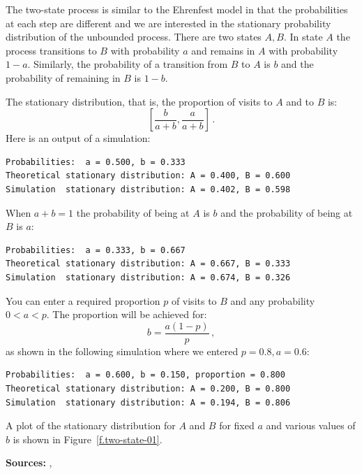 \documentclass[11pt,a4paper]{article}
\begin{document}
The two-state process is similar to the Ehrenfest model in that the probabilities at each step are different and we are interested in the stationary probability distribution of the unbounded process. There are two states $A,B$. In state $A$ the process transitions to $B$  with probability $a$ and remains in $A$ with probability $1-a$. Similarly, the probability of a transition from $B$ to $A$ is $b$ and the probability of remaining in $B$ is $1-b$.
\begin{center}
\end{center}
The stationary distribution, that is, the proportion of visits to $A$ and to $B$ is:
\[
\left[\frac{b}{a+b}, \frac{a}{a+b}\right]\,.
\]
Here is an output of a simulation:
\begin{verbatim}
Probabilities:  a = 0.500, b = 0.333
Theoretical stationary distribution: A = 0.400, B = 0.600
Simulation  stationary distribution: A = 0.402, B = 0.598
\end{verbatim}
When $a+b=1$ the probability of being at $A$ is $b$ and the probability of being at $B$ is $a$:
\begin{verbatim}
Probabilities:  a = 0.333, b = 0.667
Theoretical stationary distribution: A = 0.667, B = 0.333
Simulation  stationary distribution: A = 0.674, B = 0.326
\end{verbatim}
You can enter a required proportion $p$ of visits to $B$ and any probability $0<a<p$. The proportion will be achieved for:
\[
b = \frac{a(1-p)}{p}\,,
\]
as shown in the following simulation where we entered $p=0.8, a=0.6$:
\begin{verbatim}
Probabilities:  a = 0.600, b = 0.150, proportion = 0.800
Theoretical stationary distribution: A = 0.200, B = 0.800
Simulation  stationary distribution: A = 0.194, B = 0.806
\end{verbatim}
A plot of the stationary distribution for $A$ and $B$ for fixed $a$ and various values of $b$ is shown in Figure~\ref{f.two-state-01}.

\textbf{Sources:} \cite[Section 4.5]{privault}, \cite[Example 11.1.3]{BW}
\end{document}
